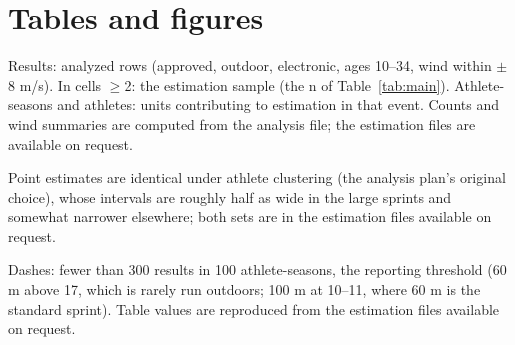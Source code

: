 \documentclass[12pt,a4paper]{article}
\begin{document}
\clearpage



\appendix
\nolinenumbers
\section*{Tables and figures}

\clearpage
\begin{table}[H]
\centering
\caption{Analyzed events: volume, marks, and wind exposure (2011--2026).}
\label{tab:sample}
\footnotesize
\resizebox{\textwidth}{!}{}
\vspace{0.3em}
\parbox{0.95\textwidth}{\footnotesize Results: analyzed rows (approved, outdoor, electronic, ages 10--34, wind within $\pm$8 m/s). In cells $\geq$2: the estimation sample (the n of Table~\ref{tab:main}). Athlete-seasons and athletes: units contributing to estimation in that event. Counts and wind summaries are computed from the analysis file; the estimation files are available on request.}
\end{table}

\clearpage
\begin{table}[H]
\centering
\caption{Effect per m/s of wind (linear fit over head- and tailwinds, signed as a gain with tailwind), within athlete $\times$ season (95\,\% CIs clustered on meet).}
\label{tab:main}
\small
\resizebox{\textwidth}{!}{}
\vspace{0.2em}
\parbox{0.9\textwidth}{\footnotesize Point estimates are identical under athlete clustering (the analysis plan's original choice), whose intervals are roughly half as wide in the large sprints and somewhat narrower elsewhere; both sets are in the estimation files available on request.}
\end{table}

\clearpage
\begin{table}[H]
\centering
\caption{Effect per m/s of wind (linear fit; seconds, 95\,\% CI clustered on meet) by age band and sex, sprints.}
\label{tab:age}
\footnotesize
\resizebox{\textwidth}{!}{}
\vspace{0.2em}
\parbox{0.97\textwidth}{\footnotesize Dashes: fewer than 300 results in 100 athlete-seasons, the reporting threshold (60 m above 17, which is rarely run outdoors; 100 m at 10--11, where 60 m is the standard sprint). Table values are reproduced from the estimation files available on request.}
\end{table}
\end{document}
